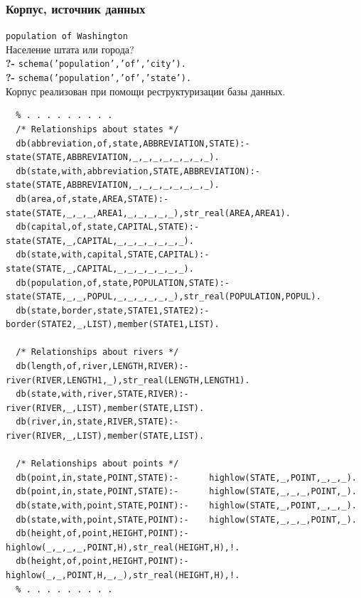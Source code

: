 \documentclass[10pt]{beamer}
\begin{document}
\begin{frame}[fragile]
  \frametitle{Корпус, источник данных}
  \texttt{population of Washington}\\
  Население штата или города?\\
  \textbf{?-} \texttt{schema('population','of','city').}\\
  \textbf{?-} \texttt{schema('population','of','state').}\\
  Корпус реализован при помощи реструктуризации базы данных.
\begin{verbatim}
  % . . . . . . . . .
  /* Relationships about states */
  db(abbreviation,of,state,ABBREVIATION,STATE):-  state(STATE,ABBREVIATION,_,_,_,_,_,_,_,_).
  db(state,with,abbreviation,STATE,ABBREVIATION):-state(STATE,ABBREVIATION,_,_,_,_,_,_,_,_).
  db(area,of,state,AREA,STATE):-        state(STATE,_,_,_,AREA1,_,_,_,_,_),str_real(AREA,AREA1).
  db(capital,of,state,CAPITAL,STATE):-  state(STATE,_,CAPITAL,_,_,_,_,_,_,_).
  db(state,with,capital,STATE,CAPITAL):-state(STATE,_,CAPITAL,_,_,_,_,_,_,_).
  db(population,of,state,POPULATION,STATE):-state(STATE,_,_,POPUL,_,_,_,_,_,_),str_real(POPULATION,POPUL).
  db(state,border,state,STATE1,STATE2):-border(STATE2,_,LIST),member(STATE1,LIST).

  /* Relationships about rivers */
  db(length,of,river,LENGTH,RIVER):-    river(RIVER,LENGTH1,_),str_real(LENGTH,LENGTH1).
  db(state,with,river,STATE,RIVER):-    river(RIVER,_,LIST),member(STATE,LIST).
  db(river,in,state,RIVER,STATE):-      river(RIVER,_,LIST),member(STATE,LIST).

  /* Relationships about points */
  db(point,in,state,POINT,STATE):-      highlow(STATE,_,POINT,_,_,_).
  db(point,in,state,POINT,STATE):-      highlow(STATE,_,_,_,POINT,_).
  db(state,with,point,STATE,POINT):-    highlow(STATE,_,POINT,_,_,_).
  db(state,with,point,STATE,POINT):-    highlow(STATE,_,_,_,POINT,_).
  db(height,of,point,HEIGHT,POINT):-    highlow(_,_,_,_,POINT,H),str_real(HEIGHT,H),!.
  db(height,of,point,HEIGHT,POINT):-    highlow(_,_,POINT,H,_,_),str_real(HEIGHT,H),!.
  % . . . . . . . . .
\end{verbatim}
\end{frame}
\end{document}
